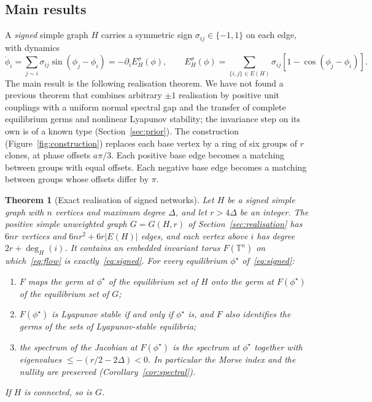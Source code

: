 \documentclass[11pt,a4paper]{article}
\newtheorem{theorem}{Theorem}
\theoremstyle{definition}\newtheorem{conjecture}{Conjecture}
\theoremstyle{remark}\newtheorem{remark}[theorem]{Remark}
\newcommand{\T}{\mathbb T}
\begin{document}
\subsection{Main results}

A \emph{signed} simple graph $H$ carries a symmetric sign $\sigma_{ij}\in\{-1,1\}$ on each edge, with dynamics
\begin{equation}\label{eq:signed}
 \dot\phi_i=\sum_{j\sim i}\sigma_{ij}\sin(\phi_j-\phi_i)=-\partial_iE_H^\sigma(\phi),\qquad
 E_H^\sigma(\phi)=\sum_{\{i,j\}\in E(H)}\sigma_{ij}[1-\cos(\phi_j-\phi_i)].
\end{equation}
The main result is the following realisation theorem. We have not found a previous theorem that combines arbitrary $\pm1$ realisation by positive unit couplings with a uniform normal spectral gap and the transfer of complete equilibrium germs and nonlinear Lyapunov stability; the invariance step on its own is of a known type (Section~\ref{sec:prior}). The construction (Figure~\ref{fig:construction}) replaces each base vertex by a ring of six groups of $r$ clones, at phase offsets $a\pi/3$. Each positive base edge becomes a matching between groups with equal offsets. Each negative base edge becomes a matching between groups whose offsets differ by $\pi$.

\begin{theorem}[Exact realisation of signed networks]\label{thm:realisation}
Let $H$ be a signed simple graph with $n$ vertices and maximum degree $\Delta$, and let $r>4\Delta$ be an integer. The positive simple unweighted graph $G=G(H,r)$ of Section~\ref{sec:realisation} has $6nr$ vertices and $6nr^2+6r|E(H)|$ edges, and each vertex above $i$ has degree $2r+\deg_H(i)$. It contains an embedded invariant torus $F(\T^n)$ on which~\eqref{eq:flow} is exactly~\eqref{eq:signed}. For every equilibrium $\phi^\star$ of~\eqref{eq:signed}:
\begin{enumerate}[label=(\alph*)]
\item $F$ maps the germ at $\phi^\star$ of the equilibrium set of $H$ onto the germ at $F(\phi^\star)$ of the equilibrium set of $G$;
\item $F(\phi^\star)$ is Lyapunov stable if and only if $\phi^\star$ is, and $F$ also identifies the germs of the sets of Lyapunov-stable equilibria;
\item the spectrum of the Jacobian at $F(\phi^\star)$ is the spectrum at $\phi^\star$ together with eigenvalues $\le-(r/2-2\Delta)<0$. In particular the Morse index and the nullity are preserved (Corollary~\ref{cor:spectral}).
\end{enumerate}
If $H$ is connected, so is $G$.
\end{theorem}
\end{document}
